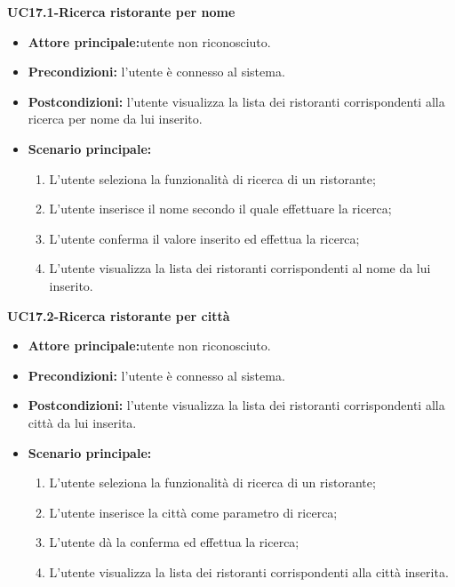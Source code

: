 \textbf{UC17.1-Ricerca ristorante per nome}
\begin{itemize}
\item \textbf{Attore principale:}utente non riconosciuto.
\item \textbf{Precondizioni:} l'utente è connesso al sistema.
\item \textbf{Postcondizioni:} l'utente visualizza la lista dei ristoranti corrispondenti 
alla ricerca per nome da lui inserito.
\item \textbf{Scenario principale:}
\begin{enumerate}
    \item L'utente seleziona la funzionalità di ricerca di un ristorante;
    \item L'utente inserisce il nome secondo il quale effettuare la ricerca;
    \item L'utente conferma il valore inserito ed effettua la ricerca;
    \item L'utente visualizza la lista dei ristoranti corrispondenti al nome da lui inserito.
\end{enumerate}
\end{itemize}

\textbf{UC17.2-Ricerca ristorante per città}
\begin{itemize}
\item \textbf{Attore principale:}utente non riconosciuto.
\item \textbf{Precondizioni:} l'utente è connesso al sistema.
\item \textbf{Postcondizioni:} l'utente visualizza la lista dei ristoranti corrispondenti alla città da lui inserita.
\item \textbf{Scenario principale:}
\begin{enumerate}
    \item L'utente seleziona la funzionalità di ricerca di un ristorante;
    \item L'utente inserisce la città come parametro di ricerca;
    \item L'utente dà la conferma ed effettua la ricerca;
    \item L'utente visualizza la lista dei ristoranti corrispondenti alla città inserita.
\end{enumerate}
\end{itemize}

